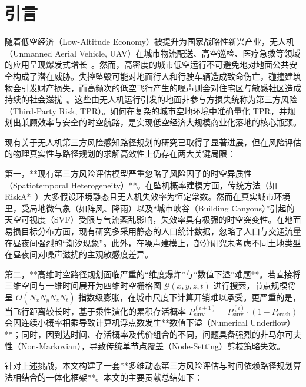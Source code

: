 
\section{引言}
\label{sec:introduction}

随着低空经济（Low-Altitude Economy）被提升为国家战略性新兴产业，无人机（Unmanned Aerial Vehicle, UAV）在城市物流配送、高空巡检、医疗急救等领域的应用呈现爆发式增长~\cite{Li2023, Primatesta2022}。然而，高密度的城市低空运行不可避免地对地面公共安全构成了潜在威胁。失控坠毁可能对地面行人和行驶车辆造成致命伤亡，碰撞建筑物会引发财产损失，而高频次的低空飞行产生的噪声则会对住宅区与敏感社区造成持续的社会滋扰~\cite{Primatesta2022}。这些由无人机运行引发的地面非参与方损失统称为第三方风险（Third-Party Risk, TPR）。如何在复杂的城市空地环境中准确量化 TPR，并规划出兼顾效率与安全的时空航路，是实现低空经济大规模商业化落地的核心瓶颈。

现有关于无人机第三方风险感知路径规划的研究已取得了显著进展，但在风险评估的物理真实性与路径规划的求解高效性上仍存在两大关键局限：

第一，**现有第三方风险评估模型严重忽略了风险因子的时空异质性（Spatiotemporal Heterogeneity）**。在坠机概率建模方面，传统方法（如 RiskA*~\cite{Primatesta2019}）大多假设环境静态且无人机失效率为恒定常数。然而在真实城市环境里，受局地微气象（如阵风、降雨）以及“城市峡谷（Building Canyons）”引起的天空可视度（SVF）受限与气流紊乱影响，失效率具有极强的时空突变性。在地面易损目标分布方面，现有研究多采用静态的人口统计数据，忽略了人口与交通流量在昼夜间强烈的“潮汐现象”。此外，在噪声建模上，部分研究未考虑不同土地类型在昼夜间对噪声滋扰的主观敏感度差异。

第二，**高维时空路径规划面临严重的“维度爆炸”与“数值下溢”难题**。若直接将三维空间与一维时间展开为四维时空栅格图 $\mathcal{G}(x,y,z,t)$ 进行搜索，节点规模将呈 $O(N_x N_y N_z N_t)$ 指数级膨胀，在城市尺度下计算开销难以承受。更严重的是，当飞行距离较长时，基于乘性演化的累积存活概率 $P_{\mathrm{surv}}^{(i+1)} = P_{\mathrm{surv}}^{(i)} \cdot (1 - P_{\mathrm{crash}})$ 会因连续小概率相乘导致计算机浮点数发生**数值下溢（Numerical Underflow）**；同时，因到达时间、存活概率及代价组合的不同，问题具备强烈的非马尔可夫性（Non-Markovian），导致传统单节点覆盖（Node-Setting）剪枝策略失效。

针对上述挑战，本文构建了一套**多维动态第三方风险评估与时间依赖路径规划算法相结合的一体化框架**。本文的主要贡献总结如下：

